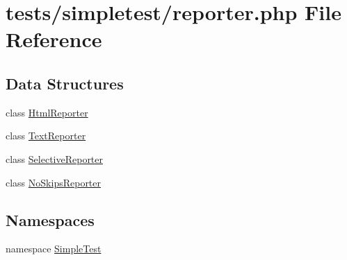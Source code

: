 \hypertarget{reporter_8php}{\section{tests/simpletest/reporter.php File Reference}
\label{reporter_8php}
}
\subsection*{Data Structures}
\begin{DoxyCompactItemize}
\item 
class \hyperlink{class_html_reporter}{Html\-Reporter}
\item 
class \hyperlink{class_text_reporter}{Text\-Reporter}
\item 
class \hyperlink{class_selective_reporter}{Selective\-Reporter}
\item 
class \hyperlink{class_no_skips_reporter}{No\-Skips\-Reporter}
\end{DoxyCompactItemize}
\subsection*{Namespaces}
\begin{DoxyCompactItemize}
\item 
namespace \hyperlink{namespace_simple_test}{Simple\-Test}
\end{DoxyCompactItemize}
